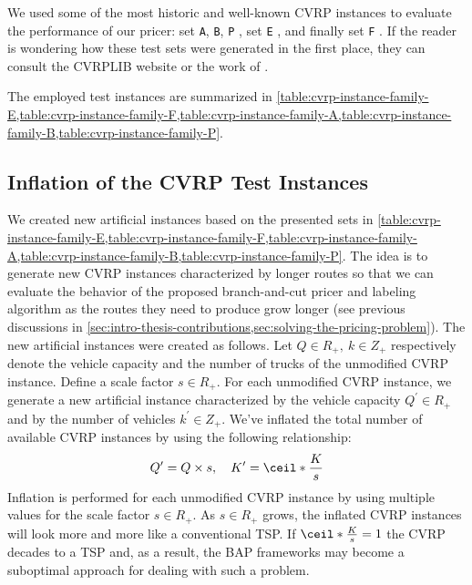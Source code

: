 \medskip

We used some of the most historic and well-known CVRP instances to evaluate the performance of our pricer:
set \texttt{A}, \texttt{B}, \texttt{P} \parencite{augerat1995},
set \texttt{E} \parencite{dantzig1959, christofides1969, gaskell1967bases, gillett1974heuristic},
and finally set \texttt{F} \parencite{fisher1994}.
If the reader is wondering how these test sets were generated in the first place,
they can consult the CVRPLIB website or the work of \textcite{uchoa2017}.

The employed test instances are summarized in
\cref{table:cvrp-instance-family-E,table:cvrp-instance-family-F,table:cvrp-instance-family-A,table:cvrp-instance-family-B,table:cvrp-instance-family-P}.



\subsection{Inflation of the CVRP Test Instances}
\label{sec:inflation-of-the-cvrp-test-instances}

We created new artificial instances based on the presented sets in
\cref{table:cvrp-instance-family-E,table:cvrp-instance-family-F,table:cvrp-instance-family-A,table:cvrp-instance-family-B,table:cvrp-instance-family-P}.
The idea is to generate new CVRP instances characterized by longer routes
so that we can evaluate the behavior of the proposed branch-and-cut pricer and labeling algorithm
as the routes they need to produce grow longer (see previous discussions in
\cref{sec:intro-thesis-contributions,sec:solving-the-pricing-problem}).
The new artificial instances were created as follows.
Let $Q \in R_+,\ k \in Z_+$ respectively denote the vehicle
capacity and the number of trucks of the unmodified CVRP instance.
Define a scale factor $s \in R_+$.
For each unmodified CVRP instance, we generate a new artificial instance
characterized by the vehicle capacity $Q^\prime \in R_+$
and by the number of vehicles $k^\prime \in Z_+$.
We've inflated the total number of available CVRP instances
by using the following relationship:
$$
	Q^\prime = Q \times s, \quad K^\prime = \ceil*{\frac{K}{s}}
$$
Inflation is performed for each unmodified CVRP instance by using
multiple values for the scale factor $s \in R_+$.
As $s \in R_+$ grows, the inflated CVRP instances will look more and more like a conventional TSP.
If $\ceil*{\frac{K}{s}} = 1$ the CVRP decades to a TSP and, as a result,
the BAP frameworks may become a suboptimal approach for dealing with such a problem.

